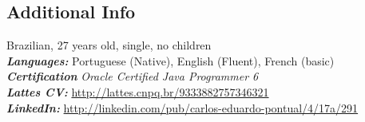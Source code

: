 \documentclass[margin, 10pt]{res} %
\begin{document}
\begin{resume}
\section {Additional Info}
Brazilian, 27 years old, single, no children \\
{\sl\bf Languages:} Portuguese (Native), English (Fluent), French (basic) \\
{\sl\bf Certification} {\sl Oracle Certified Java Programmer 6} \\
{\sl\bf Lattes CV:} \url{http://lattes.cnpq.br/9333882757346321} \\
{\sl\bf LinkedIn:} \url{http://linkedin.com/pub/carlos-eduardo-pontual/4/17a/291} \\



\end{resume}
\end{document}

